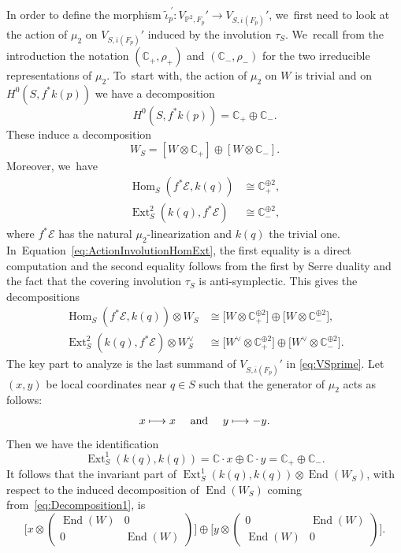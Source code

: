 \documentclass[11pt]{article}
\newcommand\mto{\mathchoice{\longmapsto}{\mapsto}{\mapsto}{\mapsto}}
\newcommand{\CC}{{\mathbb C}}\let\C\CC
\newcommand{\PP}{{\mathbb P}}\let\P\PP
\newcommand\cE{\mathcal{E}}
\DeclareMathOperator{\End}{End}
\DeclareMathOperator{\Ext}{Ext}
\DeclareMathOperator{\Hom}{Hom}
\theoremstyle{definition}
\begin{document}
In order to define the morphism $\widetilde{\iota}_p^{\ \prime}\colon V_{\PP^2,F_p}'\to V_{S,\overline{\iota}(F_p)}'$, we~first need to look at the action of $\mu_2$ on $V_{S,\overline{\iota}(F_p)}'$ induced by the involution $\tau_{S}$. We~recall from the introduction the notation $(\CC_{+},\rho_+)$ and $(\CC_{-},\rho_-)$ for the two irreducible representations of $\mu_2$. To~start with, the action of $\mu_2$ on $W$ is trivial and on $H^0(S,f^*k(p))$ we have a decomposition
\[
H^0(S,f^*k(p)) = \C_+ \oplus \C_-.
\]
These induce a decomposition
\begin{equation}\label{eq:Decomposition1}
W_S=\left[W\otimes \CC_{+}\right] \oplus[W\otimes \CC_{-}].
\end{equation}
Moreover, we~have
\begin{equation}\label{eq:ActionInvolutionHomExt}
\begin{split}
\Hom_{S}(f^*\cE,k(q)) &\cong \CC_{+}^{\oplus 2},\\
\Ext^2_{S}(k(q),f^*\cE) &\cong \CC_{-}^{\oplus 2},
\end{split}
\end{equation}
where $f^*\cE$ has the natural $\mu_2$-linearization and $k(q)$ the trivial one. In~Equation~\eqref{eq:ActionInvolutionHomExt}, the first equality is a direct computation and the second equality follows from the first by Serre duality and the fact that the covering involution $\tau_S$ is anti-symplectic.
This gives the decompositions
\begin{equation}\label{eq:ActionInvolutionHomExtW}
\begin{split}
\Hom_{S}(f^*\cE,k(q))\otimes W_S&\cong \bigl[W\otimes \CC_{+}^{\oplus 2}\bigr] \oplus \bigl[W\otimes \CC_{-}^{\oplus 2}\bigr],\\
\Ext^2_{S}(k(q),f^*\cE)\otimes W_S^\vee&\cong \bigl[W^\vee\otimes \CC_{+}^{\oplus 2}\bigr] \oplus \bigl[W^\vee\otimes \CC_{-}^{\oplus 2}\bigr].
\end{split}
\end{equation}
The key part to analyze is the last summand of $V_{S,\overline{\iota}(F_p)}'$ in \eqref{eq:VSprime}.
Let $(x,y)$ be local coordinates near $q\in S$ such that the generator of $\mu_2$ acts as follows:
\[
x\mto x\quad\text{ and }\quad y\mto -y.
\]
Then we have the identification
\begin{equation*}\label{eq:ExtDecomposition}
\Ext^1_{S}(k(q),k(q)) = \CC\cdot x \oplus \CC\cdot y = \CC_{+} \oplus \CC_{-}.
\end{equation*}
It follows that the invariant part of $\Ext^1_{S}(k(q),k(q))\otimes \End(W_S)$, with respect to the induced decomposition of $\End(W_S)$ coming from~\eqref{eq:Decomposition1}, is
\[
\biggl[x \otimes \begin{pmatrix}\End(W)&0\\0&\End(W)\end{pmatrix}\biggr] \oplus \biggl[y\otimes \begin{pmatrix}0&\End(W)\\\End(W)&0\end{pmatrix}\biggr].
\]
\end{document}
